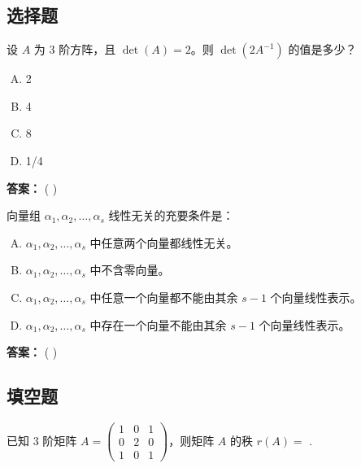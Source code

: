 \documentclass[a4paper, 12pt]{ctexart}
\begin{document}
\subsection{选择题}

\begin{exercise}
    设 $A$ 为 3 阶方阵，且 $\det(A) = 2$。则 $\det(2A^{-1})$ 的值是多少？
    \begin{enumerate}[A.]
        \item 2
        \item 4
        \item 8
        \item 1/4
    \end{enumerate}
\end{exercise}
\noindent\textbf{答案：} (       )

\vspace{0.5cm}

\begin{exercise}
    向量组 $\alpha_1, \alpha_2, \dots, \alpha_s$ 线性无关的充要条件是：
    \begin{enumerate}[A.]
        \item $\alpha_1, \alpha_2, \dots, \alpha_s$ 中任意两个向量都线性无关。
        \item $\alpha_1, \alpha_2, \dots, \alpha_s$ 中不含零向量。
        \item $\alpha_1, \alpha_2, \dots, \alpha_s$ 中任意一个向量都不能由其余 $s-1$ 个向量线性表示。
        \item $\alpha_1, \alpha_2, \dots, \alpha_s$ 中存在一个向量不能由其余 $s-1$ 个向量线性表示。
    \end{enumerate}
\end{exercise}
\noindent\textbf{答案：} (       )

\vspace{1cm}

\subsection{填空题}

\begin{exercise}
    已知 3 阶矩阵 $A = \begin{pmatrix} 1 & 0 & 1 \\ 0 & 2 & 0 \\ 1 & 0 & 1 \end{pmatrix}$，则矩阵 $A$ 的秩 $r(A) = $ \underline{\hspace{2cm}}.
\end{exercise}
\end{document}
